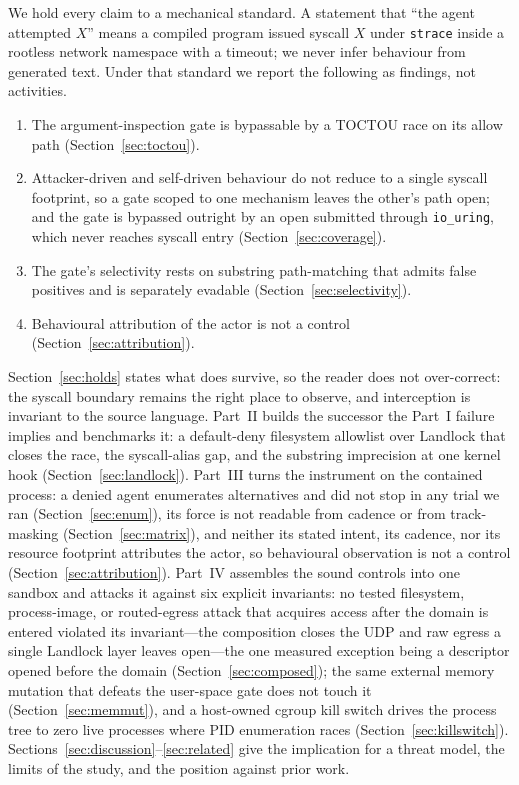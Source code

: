 \documentclass[11pt]{article}
\begin{document}
We hold every claim to a mechanical standard. A statement that ``the agent attempted $X$''
means a compiled program issued syscall $X$ under \texttt{strace} inside a rootless network
namespace with a timeout; we never infer behaviour from generated text. Under that
standard we report the following as findings, not activities.

\begin{enumerate}[leftmargin=1.4em,itemsep=2pt]
\item The argument-inspection gate is bypassable by a TOCTOU race on its allow path
(Section~\ref{sec:toctou}).
\item Attacker-driven and self-driven behaviour do not reduce to a single syscall footprint, so a
gate scoped to one mechanism leaves the other's path open; and the gate is bypassed outright by an
open submitted through \texttt{io\_uring}, which never reaches syscall entry
(Section~\ref{sec:coverage}).
\item The gate's selectivity rests on substring path-matching that admits false positives and
is separately evadable (Section~\ref{sec:selectivity}).
\item Behavioural attribution of the actor is not a control (Section~\ref{sec:attribution}).
\end{enumerate}

Section~\ref{sec:holds} states what does survive, so the reader does not over-correct: the
syscall boundary remains the right place to observe, and interception is invariant to the
source language. Part~II builds the successor the Part~I failure implies and benchmarks it: a
default-deny filesystem allowlist over Landlock that closes the race, the syscall-alias gap, and the
substring imprecision at one kernel hook (Section~\ref{sec:landlock}). Part~III turns the instrument on
the contained process: a denied agent enumerates alternatives and did not stop in any trial we ran
(Section~\ref{sec:enum}),
its force is not readable from cadence or from track-masking (Section~\ref{sec:matrix}), and neither its
stated intent, its cadence, nor its resource footprint attributes the actor, so behavioural observation is
not a control (Section~\ref{sec:attribution}). Part~IV assembles the sound controls into one sandbox and attacks
it against six explicit invariants: no tested filesystem, process-image, or routed-egress attack that acquires
access after the domain is entered violated its invariant---the composition closes the UDP and raw egress a
single Landlock layer leaves open---the one measured exception being a descriptor opened before the domain
(Section~\ref{sec:composed}); the same external memory mutation that defeats the user-space gate does
not touch it (Section~\ref{sec:memmut}), and a host-owned cgroup kill switch drives the process tree to
zero live processes where PID enumeration races (Section~\ref{sec:killswitch}).
Sections~\ref{sec:discussion}--\ref{sec:related} give the
implication for a threat model, the limits of the study, and the position against prior work.
\end{document}
